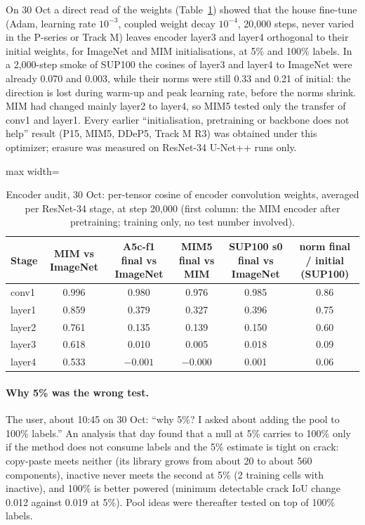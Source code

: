 On 30 Oct a direct read of the weights (Table~\ref{tab:midnov-cos}) showed that the house fine-tune (Adam, learning rate
$10^{-3}$, coupled weight decay $10^{-4}$, 20,000 steps, never varied in the P-series or Track M) leaves encoder layer3 and layer4
orthogonal to their initial weights, for ImageNet and MIM initialisations, at 5\% and 100\% labels. In a 2,000-step smoke of SUP100
the cosines of layer3 and layer4 to ImageNet were already 0.070 and 0.003, while their norms were still 0.33 and 0.21 of initial: the
direction is lost during warm-up and peak learning rate, before the norms shrink. MIM had changed mainly layer2 to layer4, so MIM5
tested only the transfer of conv1 and layer1. Every earlier ``initialisation, pretraining or backbone does not help'' result (P15,
MIM5, DDeP5, Track M R3) was obtained under this optimizer; erasure was measured on ResNet-34 U-Net++ runs only.

\begin{table}[htbp]
\centering
\footnotesize
\caption[Encoder audit: cosine of final to initial weights per stage (30 Oct)]{Encoder audit, 30 Oct: per-tensor cosine of encoder
convolution weights, averaged per ResNet-34 stage, at step 20,000 (first column: the MIM encoder after pretraining; training only, no test number involved).}
\label{tab:midnov-cos}
\begin{adjustbox}{max width=\linewidth}
\begin{tabular}{@{}lccccc@{}}
\toprule
Stage & MIM vs ImageNet & A5c-f1 final vs ImageNet & MIM5 final vs MIM & SUP100 s0 final vs ImageNet & norm final / initial (SUP100) \\
\midrule
conv1 & 0.996 & 0.980 & 0.976 & 0.985 & 0.86 \\
layer1 & 0.859 & 0.379 & 0.327 & 0.396 & 0.75 \\
layer2 & 0.761 & 0.135 & 0.139 & 0.150 & 0.60 \\
layer3 & 0.618 & 0.010 & 0.005 & 0.018 & 0.09 \\
layer4 & 0.533 & $-0.001$ & $-0.000$ & 0.001 & 0.06 \\
\bottomrule
\end{tabular}
\end{adjustbox}
\end{table}

\paragraph{Why 5\% was the wrong test.} The user, about 10:45 on 30 Oct: ``why 5\%? I asked about adding the pool to 100\% labels.''
An analysis that day found that a null at 5\% carries to 100\% only if the method does not consume labels and the 5\% estimate is
tight on crack: copy-paste meets neither (its library grows from about 20 to about 560 components), inactive never meets the second
at 5\% (2 training cells with inactive), and 100\% is better powered (minimum detectable crack IoU change 0.012 against 0.019 at 5\%).
Pool ideas were thereafter tested on top of 100\% labels.


